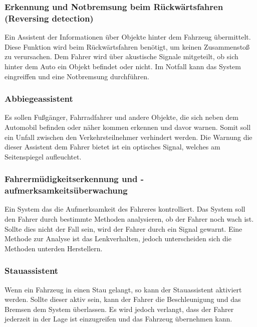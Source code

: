         \subsubsection{Erkennung und Notbremsung beim Rückwärtsfahren (Reversing detection)}
        Ein Assistent der Informationen über Objekte hinter dem Fahrzeug übermittelt. Diese Funktion
        wird beim Rückwärtsfahren benötigt, um keinen Zusammenstoß zu verursachen. Dem Fahrer wird 
        über akustische Signale mitgeteilt, ob sich hinter dem Auto ein Objekt befindet oder nicht.
        Im Notfall kann das System eingreiffen und eine Notbremsung durchführen.
        ~\cite{assistenzsysteme.PB2}  ~\cite{reversedetection.PB1}

        \subsubsection{Abbiegeassistent}
        Es sollen Fußgänger, Fahrradfahrer und andere Objekte, die sich neben dem Automobil befinden
        oder näher kommen erkennen und davor warnen. Somit soll ein Unfall zwischen den Verkehrsteilnehmer
        verhindert werden. Die Warnung die dieser Assistent dem Fahrer bietet ist ein optisches Signal,
        welches am Seitenspiegel aufleuchtet.
        ~\cite{assistenzsysteme.PB2} ~\cite{abbiegeassi.PB1} ~\cite{abbiegeassi.PB2}

        \subsubsection{Fahrermüdigkeitserkennung und -aufmerksamkeitsüberwachung}
        Ein System das die Aufmerksamkeit des Fahreres kontrolliert. Das System soll den Fahrer durch
        bestimmte Methoden analysieren, ob der Fahrer noch wach ist. Sollte dies nicht der Fall sein,
        wird der Fahrer durch ein Signal gewarnt. Eine Methode zur Analyse ist das Lenkverhalten, jedoch
        unterscheiden sich die Methoden unterden Herstellern.
        ~\cite{muedigkeitsassi.PB1} ~\cite{assistenzsysteme.PB1}  ~\cite{assistenzsysteme.PB2}
        ~\cite{muedigkeitsassi.PB2}
        
        \subsubsection{Stauassistent}
        Wenn ein Fahrzeug in einen Stau gelangt, so kann der Stauassistent aktiviert werden. Sollte dieser
        aktiv sein, kann der Fahrer die Beschleunigung und das Bremsen dem System überlassen. Es wird
        jedoch verlangt, dass der Fahrer jederzeit in der Lage ist einzugreifen und das Fahrzeug übernehmen
        kann.
        ~\cite{stauassi.PB1} ~\cite{stauassi.PB2}
        

